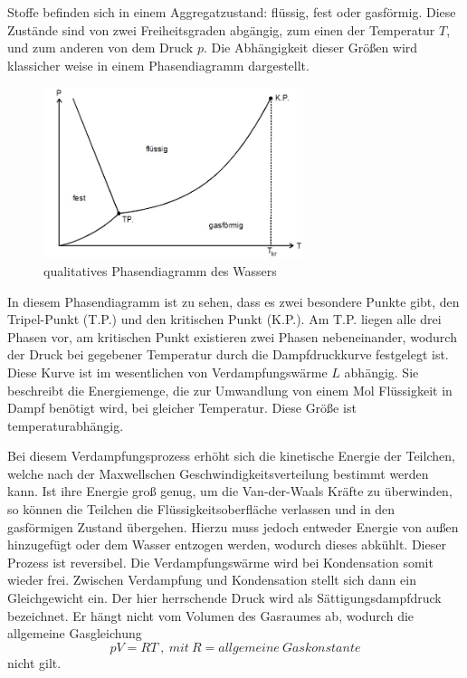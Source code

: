 Stoffe befinden sich in einem Aggregatzustand: flüssig, fest oder gasförmig.
Diese Zustände sind von zwei Freiheitsgraden abgängig, zum einen der Temperatur $T$,
und zum anderen von dem Druck $p$. Die Abhängigkeit dieser Größen wird klassicher
weise in einem Phasendiagramm dargestellt.

\begin{figure}   %
  \centering
  \includegraphics[height=5cm]{Zustandsdiagramm.jpeg}
  \caption{qualitatives Phasendiagramm des Wassers}
  \label{fig:phase}
\end{figure}

In diesem Phasendiagramm ist zu sehen, dass es zwei besondere Punkte gibt,
den Tripel-Punkt (T.P.) und den kritischen Punkt (K.P.). Am T.P. liegen alle drei
Phasen vor, am kritischen Punkt existieren zwei Phasen nebeneinander, wodurch
der Druck bei gegebener Temperatur durch die Dampfdruckkurve festgelegt ist.
Diese Kurve ist im wesentlichen von Verdampfungswärme $L$ abhängig. Sie beschreibt
die Energiemenge, die zur Umwandlung von einem Mol Flüssigkeit in Dampf benötigt wird,
bei gleicher Temperatur. Diese Größe ist temperaturabhängig.

Bei diesem Verdampfungsprozess erhöht sich die kinetische Energie der Teilchen,
welche nach der Maxwellschen Geschwindigkeitsverteilung bestimmt werden kann. Ist
ihre Energie groß genug, um die Van-der-Waals Kräfte zu überwinden, so können die
Teilchen die Flüssigkeitsoberfläche verlassen und in den gasförmigen Zustand übergehen.
Hierzu muss jedoch entweder Energie von außen hinzugefügt oder dem Wasser entzogen
werden, wodurch dieses abkühlt. Dieser Prozess ist reversibel. Die Verdampfungswärme
wird bei Kondensation somit wieder frei. Zwischen Verdampfung und Kondensation stellt
sich dann ein Gleichgewicht ein. Der hier herrschende Druck wird als Sättigungsdampfdruck
bezeichnet. Er hängt nicht vom Volumen des Gasraumes ab, wodurch die allgemeine
Gasgleichung
\begin{equation}
  pV = RT   \ ,\ mit \ R = allgemeine \ Gaskonstante \label{eq:ideal}
\end{equation}
nicht gilt.

